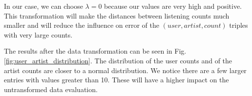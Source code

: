 In our case, we can choose $\lambda=0$ because our values are very high and positive. This transformation will make the distances between listening counts much smaller and will reduce the influence on error of the $(user,artist,count)$ triples with very large counts.
\par The results after the data transformation can be seen in Fig. \ref{fig:user_artist_distribution}. The distribution of the user counts and of the artist counts are closer to a normal distribution. We notice there are a few larger entries with values greater than 10. These will have a higher impact on the untransformed data evaluation. 



